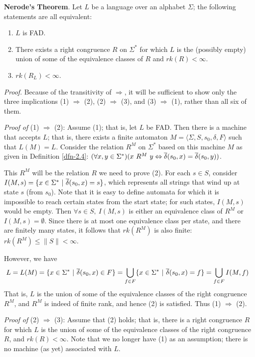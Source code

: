 \begin{thm}\label{thm-2.2}
\textbf{Nerode's Theorem}. Let $L$ be a language over an alphabet $\Sigma$; the
following statements are all equivalent:
\begin{enumerate}
\item $L$ is FAD.
\item There exists a right congruence $R$ on $\Sigma^*$ for which $L$ is the
(possibly empty) union of some of the equivalence classes of $R$ and $rk(R) <
	\infty$.
\item $rk(R_L) < \infty$.
\end{enumerate}

\emph{Proof.} Because of the transitivity of $\Rightarrow$, it will be
sufficient to show only the three implications (1) $\Rightarrow$ (2), (2) 
$\Rightarrow$ (3), and (3) $\Rightarrow$ (1), rather than all six of them.

\emph{Proof of} (1) $\Rightarrow$ (2): Assume (1); that is, let $L$ be FAD. Then
there is a machine that accepts $L$; that is, there exists a finite automaton
$M=\langle\Sigma,S,s_0,\delta,F\rangle$ such that $L(M) = L$. Consider the
relation $R^M$ on $\Sigma^*$ based on this machine $M$ as given in Definition
\ref{dfn-2.4}: $(\forall x,y \in \Sigma^*)(x\ R^M\ y \Leftrightarrow \overline{\delta}(s_0,x) =
\overline{\delta}(s_0,y))$.

This $R^M$ will be the relation $R$ we need to prove (2). For each $s \in S$,
consider $I(M,s)=\{x \in \Sigma^*\ |\ \DBAR(s_0,x) = s\}$, which represents all
strings that wind up at state $s$ (from $s_0$). Note that it is easy to define
automata for which it is impossible to reach certain states from the start
state; for such states, $I(M,s)$ would be empty. Then $\forall s \in S,\ I(M,s)$
is either an equivalence class of $R^M$ or $I(M,s)=\emptyset$. Since there is at
most one equivalence class per state, and there are finitely many states,
it follows that $rk(R^M)$ is also finite: $rk(R^M) \leq \|S\| < \infty$.

However, we have
\[ L=L(M) = \{x \in \Sigma^*\ |\ \overline{\delta}(s_0,x) \in F\}= \bigcup\limits_{f \in F}
	\{x \in \Sigma^*\ |\ \overline{\delta}(s_0,x)=f\} = \bigcup\limits_{f \in F} I(M,f) \]
That is, $L$ is the union of some of the equivalence classes of the right
congruence $R^M$, and $R^M$ is indeed of finite rank, and hence (2) is
satisfied. Thus (1) $\Rightarrow$ (2).

\emph{Proof of} (2) $\Rightarrow$ (3): Assume that (2) holds; that is, there is
a right congruence $R$ for which $L$ is the union of some of the equivalence
classes of the right congruence $R$, and $rk(R) < \infty$. Note that we no
longer have (1) as an assumption; there is no machine (as yet) associated with
$L$.


\end{thm}
